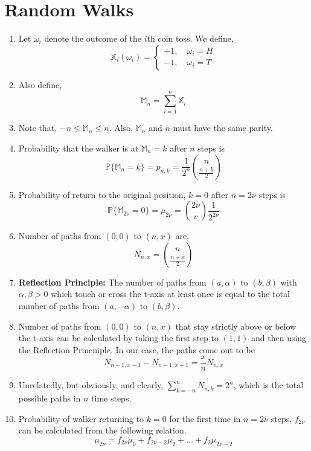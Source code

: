 
\section{Random Walks}

\begin{enumerate}
    \item Let $\omega_i$ denote the outcome of the $i$th coin toss. We define, $$\mathbb{X}_i({\omega_i}) =  \begin{cases}
        +1, \quad \omega_i = H \\
        -1, \quad \omega_i = T
    \end{cases}$$
    \item Also define, $$\mathbb{M}_n = \sum_{i=1}^{n} \mathbb{X}_i$$
    \item Note that, $ -n \leq \mathbb{M}_n \leq n$. Also, $\mathbb{M}_n$ and $n$ must have the same parity.
    \item Probability that the walker is at $\mathbb{M}_n = k$ after $n$ steps is \[\mathbb{P}\{\mathbb{M}_n = k\} = p_{n, k} = \frac{1}{2^n} {{n}\choose{\frac{n+k}{2}}}\]
    \item Probability of return to the original position, $k =0$ after $n = 2 \nu$ steps is $$\mathbb{P}\{\mathbb{M}_{2\nu} = 0\} = \mu_{2\nu} = {2 \nu \choose v} \frac{1}{2^{2\nu}}$$
    \item Number of paths from $(0, 0)$ to $(n, x)$ are, $$N_{n, x} = {n \choose {\frac{n+x}{2}}}$$
    \item \textbf{Reflection Principle:} The number of paths from $(a, \alpha)$ to $(b, \beta)$ with $\alpha, \beta > 0$ which touch or cross the t-axis at least once is equal to the total number of paths from $(a, -\alpha)$ to $(b, \beta)$.
    \item Number of paths from $(0, 0)$ to $(n, x)$ that stay strictly above or below the t-axis can be calculated by taking the first step to $(1, 1)$ and then using the Reflection Princniple. In our case, the paths come out to be $$N_{n-1, x-1} - N_{n-1, x+1} = \frac{x}{n} N_{n, x}$$
    \item Unrelatedly, but obviously, and clearly, $\sum_{k = -n}^{n} N_{n, k} = 2^n$, which is the total possible paths in $n$ time steps.
    \item Probability of walker returning to $k = 0$ for the first time in $n = 2\nu$ steps, $f_{2\nu}$ can be calculated from  the following relation. $$\mu_{2\nu} = f_{2\nu} \mu_0 + f_{2\nu -2} \mu_2 + \dots + f_2 \mu_{2 \nu - 2}$$ 

\end{enumerate}
